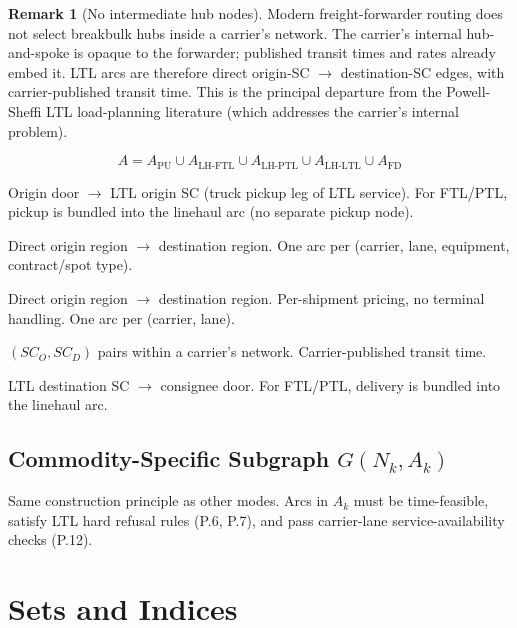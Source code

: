 \documentclass[11pt,a4paper]{article}
\theoremstyle{definition}
\newtheorem{remark}{Remark}
\begin{document}
\begin{remark}[No intermediate hub nodes]
Modern freight-forwarder routing does not select breakbulk hubs inside a carrier's network.
The carrier's internal hub-and-spoke is opaque to the forwarder; published transit times and
rates already embed it. LTL arcs are therefore direct origin-SC $\to$ destination-SC
edges, with carrier-published transit time. This is the principal departure from the
Powell-Sheffi LTL load-planning literature (which addresses the carrier's internal problem).
\end{remark}

\[
  A = A_{\text{PU}} \cup A_{\text{LH-FTL}} \cup A_{\text{LH-PTL}} \cup A_{\text{LH-LTL}} \cup A_{\text{FD}}
\]

\begin{description}[leftmargin=3.4cm, labelwidth=3.2cm, style=nextline]
  \item[$A_{\text{PU}}$ — Pickup] Origin door $\to$ LTL origin SC (truck pickup leg of LTL service).
        For FTL/PTL, pickup is bundled into the linehaul arc (no separate pickup node).
  \item[$A_{\text{LH-FTL}}$ — FTL linehaul] Direct origin region $\to$ destination region.
        One arc per (carrier, lane, equipment, contract/spot type).
  \item[$A_{\text{LH-PTL}}$ — PTL linehaul] Direct origin region $\to$ destination region.
        Per-shipment pricing, no terminal handling. One arc per (carrier, lane).
  \item[$A_{\text{LH-LTL}}$ — LTL linehaul] $(SC_O, SC_D)$ pairs within a carrier's network.
        Carrier-published transit time.
  \item[$A_{\text{FD}}$ — Final delivery] LTL destination SC $\to$ consignee door.
        For FTL/PTL, delivery is bundled into the linehaul arc.
\end{description}

\subsection{Commodity-Specific Subgraph \texorpdfstring{$G(N_k, A_k)$}{G(Nk,Ak)}}

Same construction principle as other modes. Arcs in $A_k$ must be time-feasible, satisfy LTL
hard refusal rules (P.6, P.7), and pass carrier-lane service-availability checks (P.12).

\section{Sets and Indices}
\end{document}
